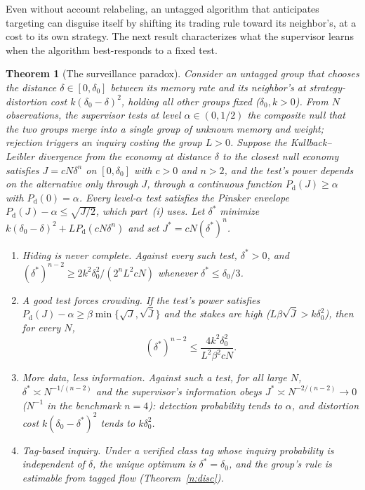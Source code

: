 \documentclass[11pt,letterpaper]{article}
\newtheorem{theorem}{Theorem}[section]
\theoremstyle{definition}
\begin{document}
Even without account relabeling, an untagged algorithm that anticipates targeting can disguise itself by shifting its trading rule toward its neighbor's, at a cost to its own strategy. The next result characterizes what the supervisor learns when the algorithm best-responds to a fixed test.

\begin{theorem}[The surveillance paradox]\label{n:paradox}
Consider an untagged group that chooses the distance $\delta \in [0, \delta_0]$ between its memory rate and its neighbor's at strategy-distortion cost $k(\delta_0 - \delta)^2$, holding all other groups fixed ($\delta_0, k > 0$). From $N$ observations, the supervisor tests at level $\alpha \in (0, 1/2)$ the composite null that the two groups merge into a single group of unknown memory and weight; rejection triggers an inquiry costing the group $L > 0$. Suppose the Kullback--Leibler divergence from the economy at distance $\delta$ to the closest null economy satisfies $J = c N \delta^n$ on $[0, \delta_0]$ with $c > 0$ and $n > 2$, and the test's power depends on the alternative only through $J$, through a continuous function $P_{\mathrm{d}}(J) \ge \alpha$ with $P_{\mathrm{d}}(0) = \alpha$. Every level-$\alpha$ test satisfies the Pinsker envelope $P_{\mathrm{d}}(J) - \alpha \le \sqrt{J/2}$, which part~(i) uses. Let $\delta^*$ minimize $k(\delta_0 - \delta)^2 + L P_{\mathrm{d}}(c N \delta^n)$ and set $J^* = c N (\delta^*)^n$.
\begin{enumerate}
  \item[(i)] \emph{Hiding is never complete.} Against every such test, $\delta^* > 0$, and $(\delta^*)^{n-2} \ge 2 k^2 \delta_0^2 / (2^n L^2 c N)$ whenever $\delta^* \le \delta_0 / 3$.
  \item[(ii)] \emph{A good test forces crowding.} If the test's power satisfies $P_{\mathrm{d}}(J) - \alpha \ge \beta \min\{\sqrt{J}, \sqrt{\bar{J}}\}$ and the stakes are high ($L \beta \sqrt{\bar{J}} > k \delta_0^2$), then for every $N$,
  \[
    (\delta^*)^{n-2} \le \frac{4 k^2 \delta_0^2}{L^2 \beta^2 c N}.
  \]
  \item[(iii)] \emph{More data, less information.} Against such a test, for all large $N$, $\delta^* \asymp N^{-1/(n-2)}$ and the supervisor's information obeys $J^* \asymp N^{-2/(n-2)} \to 0$ ($N^{-1}$ in the benchmark $n=4$): detection probability tends to $\alpha$, and distortion cost $k(\delta_0 - \delta^*)^2$ tends to $k \delta_0^2$.
  \item[(iv)] \emph{Tag-based inquiry.} Under a verified class tag whose inquiry probability is independent of $\delta$, the unique optimum is $\delta^* = \delta_0$, and the group's rule is estimable from tagged flow (Theorem~\ref{n:disc}).
\end{enumerate}
\end{theorem}
\end{document}
